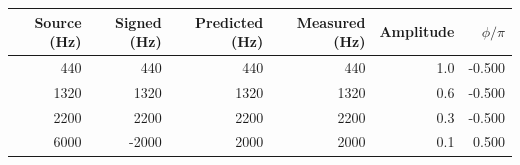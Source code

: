 \begin{tabular}{rrrrrr}
\toprule
Source (Hz) & Signed (Hz) & Predicted (Hz) & Measured (Hz) & Amplitude & $\phi/\pi$ \\
\midrule
440 & 440 & 440 & 440 & 1.0 & -0.500 \\
1320 & 1320 & 1320 & 1320 & 0.6 & -0.500 \\
2200 & 2200 & 2200 & 2200 & 0.3 & -0.500 \\
6000 & -2000 & 2000 & 2000 & 0.1 & 0.500 \\
\bottomrule
\end{tabular}
